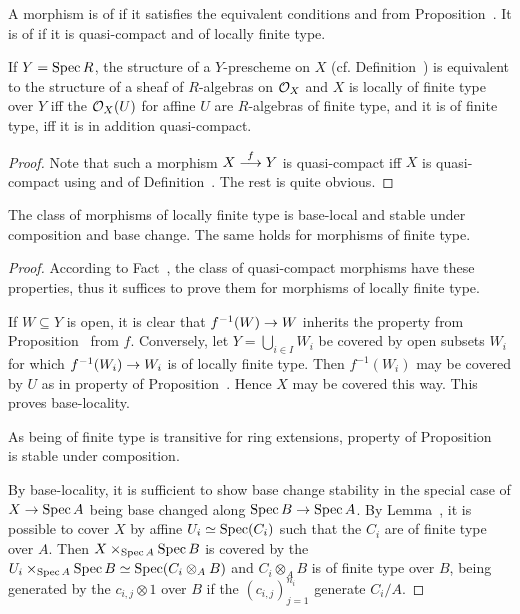 \documentclass[a4paper,parskip=half,numbers=enddot, DIV=12]{scrreprt}
\begin{document}
\begin{defi}
    A morphism is of  if it satisfies the equivalent conditions  and  from Proposition~. It is of  if it is quasi-compact and of locally finite type.
\end{defi}

\begin{fact}
    If $Y=\operatorname{Spec} R$, the structure of a $Y$-prescheme on $X$ (cf. Definition~) is equivalent to the structure of a sheaf of $R$-algebras on $\mathcal{O}_X$ and $X$ is locally of finite type over $Y$ iff the $\mathcal{O}_X(U)$ for affine $U$ are $R$-algebras of finite type, and it is of finite type, iff it is in addition quasi-compact.
\end{fact}
\begin{proof}
	Note that such a  morphism $X\morphism[f]Y$ is quasi-compact iff $X$ is quasi-compact using \itememph{\alpha} and \itememph{\gamma} of Definition~. The rest is quite obvious.
\end{proof}
\begin{fact}
    The class of morphisms of locally finite type is base-local and stable under composition and base change. The same holds for morphisms of finite type. 
\end{fact}
\begin{proof}
    According to Fact~, the class of quasi-compact morphisms have these properties, thus it suffices to prove them for morphisms of locally finite type. 
    
    If $W\subseteq Y$ is open, it is clear that $f^{-1}(W)\morphism W$ inherits the property  from Proposition~ from $f$. Conversely, let $Y=\bigcup_{i\in I}W_i$ be covered by open subsets $W_i$ for which $f^{-1}(W_i)\morphism W_i$ is of locally finite type. Then $f^{-1}(W_i)$ may be covered by $U$ as in property  of Proposition~. Hence $X$ may be covered this way. This proves base-locality.
    
    As being of finite type is transitive for ring extensions, property  of Proposition~ is stable under composition.
    
    By base-locality, it is sufficient to show base change stability in the special case of $X\morphism \Spec A$ being base changed along $\Spec B\morphism \Spec A$. By Lemma~, it is possible to cover $X$ by affine $U_i\simeq \operatorname{Spec}(C_i)$ such that the $C_i$ are of finite type over $A$. Then $X\times_{\operatorname{Spec} A} \operatorname{Spec} B$ is covered by the $U_i\times_{\operatorname{Spec} A} \operatorname{Spec} B \simeq \operatorname{Spec}(C_i\otimes_A B)$ and $C_i\otimes_A B$ is of finite type over $B$, being generated by the $c_{i,j}\otimes 1$ over $B$ if the $(c_{i,j})_{j=1}^{n_i}$ generate $C_i/A$.
\end{proof}
\end{document}
